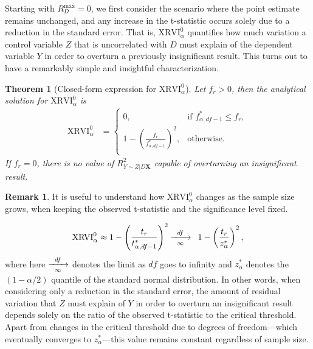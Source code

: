 \documentclass[sts]{imsart}
\theoremstyle{plain}
\newtheorem{theorem}{Theorem}
\theoremstyle{definition}
\newtheorem{remark}{Remark}
\newcommand{\df}{df}
\newcommand{\Ry}{R^2_{Y\sim Z | D\mathbf{X}}}
\newcommand{\Rdmax}{R^{\max }_{D}}
\newcommand{\fstar}{f^*_{\alpha, \df-1}}
\newcommand{\tstar}{t^*_{\alpha, \df-1}}
\newcommand{\tobs}{t_{r}}
\newcommand{\XRVI}{\text{XRVI}}
\begin{document}
Starting with $\Rdmax=0$, we first consider the scenario where the point estimate remains unchanged, and any increase in the t-statistic occurs solely due to a reduction in the standard error. That is, $\XRVI^{0}_{\alpha}$ quantifies how much variation a control variable  $Z$ that is uncorrelated with $D$ must explain of the dependent variable $Y$ in order to overturn a previously insignificant result.  This turns out to have  a remarkably simple and insightful characterization.

\begin{theorem}[Closed-form expression for $\XRVI^{0}_{\alpha}$]
\label{thm:XRVI-0}
    Let $f_{r} >0$, then the analytical solution for $\XRVI^{0}_{\alpha}$ is
    \begin{align*}
        \XRVI^{0}_{\alpha}
        &= 
        \begin{cases}
            0, &\text{if } \fstar \leq f_{r},  \\
            \displaystyle 1-\left(\frac{f_{r} }{\fstar}\right)^2,
            &\text{otherwise.} \\
        \end{cases}
    \end{align*}
    If $f_{r} = 0$, there is no value of $\Ry$ capable of overturning an insignificant result.
\end{theorem}

\begin{remark} 
\label{rmk:xrv0}
It is useful to understand how $\XRVI^{0}_{\alpha}$ changes as the sample size grows, when keeping the observed t-statistic and the significance level fixed.

\begin{align*}
    \XRVI^{0}_{\alpha} 
    \approx 1- \left(\frac{\tobs}{\tstar} \right)^2  
    \xrightarrow[\enskip\infty\enskip]{\df} \enspace 1- \left(\frac{\tobs}{z^*_{\alpha}} \right)^2,
\end{align*}
where here $ \xrightarrow[\enskip\infty\enskip]{\df}$ denotes the limit as $\df$ goes to infinity and $z^*_{\alpha}$ denotes the $(1-\alpha/2)$ quantile of the standard normal distribution. In other words, when considering only a reduction in the standard error, the amount of residual variation that $Z$ must explain of $Y$ in order to overturn an insignificant result depends solely on the ratio of the observed t-statistic to the critical threshold. Apart from changes in the critical threshold due to degrees of freedom---which eventually converges to $z^*_{\alpha}$---this value remains constant regardless of sample size.
\end{remark}
\end{document}
